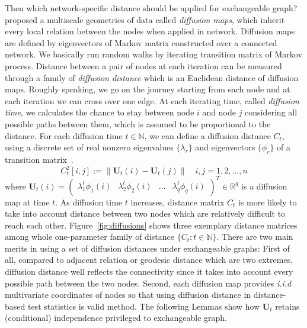 \documentclass[12pt]{article}
\theoremstyle{definition}
\begin{document}
Then which network-specific distance should be applied for exchangeable graph? \cite{coifman2006diffusion} proposed a multiscale geometries of data called \textit{diffusion maps}, which inherit every local relation between the nodes when applied in network. Diffusion maps are defined by eigenvectors of Markov matrix constructed over a connected network. We basically run random walks by iterating transition matrix of Markov process. Distance between a pair of nodes at each iteration can be measured through a family of \textit{diffusion distance} which is an Euclidean distance of diffusion maps. Roughly speaking, we go on the journey starting from each node and at each iteration we can cross over one edge. At each iterating time, called \textit{diffusion time}, we calculates the chance to stay between node $i$ and node $j$ considering all possible paths between them, which is assumed to be proportional to the distance. For each diffusion time $t \in \mathbb{N}$, we can define a diffusion distance $C_{t}$, using a discrete set of real nonzero eigenvalues $\{ \lambda_{r} \}$ and eigenvectors $\{ \phi_{r}  \}$ of a transition matrix~\citep{coifman2006diffusion,lafon2006diffusion}. 
\begin{equation}
\label{eq:diffusion}
C^2_{t}[i,j]  :=   \parallel \mathbf{U}_{t}(i) - \mathbf{U}_{t}(j) \parallel   \quad i,j = 1,2, \ldots , n
\end{equation}
where $\mathbf{U}_{t}(i) = \begin{pmatrix} \lambda^{t}_{1} \phi_{1}(i) & \lambda^{t}_{2} \phi_{2} (i)  & \ldots & \lambda^{t}_{q} \phi_{q}(i) \end{pmatrix}^{T} \in \mathbb{R}^{q}$ is a diffusion map at time $t$. As diffusion time $t$ increases, distance matrix $C_{t}$ is more likely to take into account distance between two nodes which are relatively difficult to reach each other. Figure~\ref{fig:diffusions} shows three exemplary distance matrices among whole one-parameter family of distance $\{ C_{t} : t \in \mathbb{N} \}$. There are two main merits in using a set of diffusion distances under exchangeable graphs: First of all, compared to adjacent relation or geodesic distance which are two extremes, diffusion distance well reflects the connectivity since it takes into account every possible path between the two nodes. Second, each diffusion map provides \textit{i.i.d} multivariate coordinates of nodes so that using diffusion distance in distance-based test statistics is valid method. The following Lemmas show how $\mathbf{U}_{t}$ retains (conditional) independence privileged to exchangeable graph. 
\end{document}
